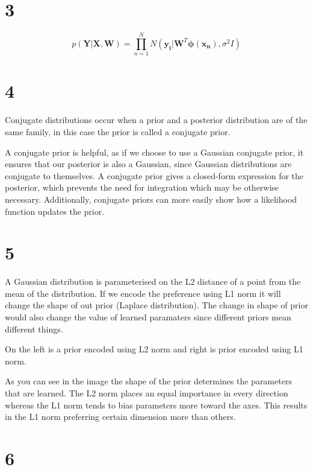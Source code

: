 \documentclass[11pt]{article}
\begin{document}
    \section*{3}\label{section}

\[
p(\mathbf{Y} | \mathbf{X}, \mathbf{W}) = \prod_{n=1}^{N} N(\boldsymbol{y_i} | \boldsymbol{W}^T\boldsymbol{\phi}(\boldsymbol{x_n}), \sigma^2 I)
\]

    \section*{4}\label{section}

Conjugate distributions occur when a prior and a posterior distribution
are of the same family, in this case the prior is called a conjugate
prior.

A conjugate prior is helpful, as if we choose to use a Gaussian
conjugate prior, it ensures that our posterior is also a Gaussian, since
Gaussian distributions are conjugate to themselves. A conjugate prior
gives a closed-form expression for the posterior, which prevents the
need for integration which may be otherwise necessary. Additionally,
conjugate priors can more easily show how a likelihood function updates
the prior.

    \section*{5}\label{section}

A Gaussian distribution is parameterised on the L2 distance of a point
from the mean of the distribution. If we encode the preference using L1
norm it will change the shape of out prior (Laplace distribution). The
change in shape of prior would also change the value of learned
paramaters since different priors mean different things.


On the left is a prior encoded using L2 norm and right is prior encoded using L1 norm.

As you can see in the image the shape of the prior determines the
parameters that are learned. The L2 norm places an equal importance in
every direction whereas the L1 norm tends to bias parameters more toward
the axes. This results in the L1 norm preferring certain dimension more
than others.

    \section*{6}\label{section}
\end{document}
